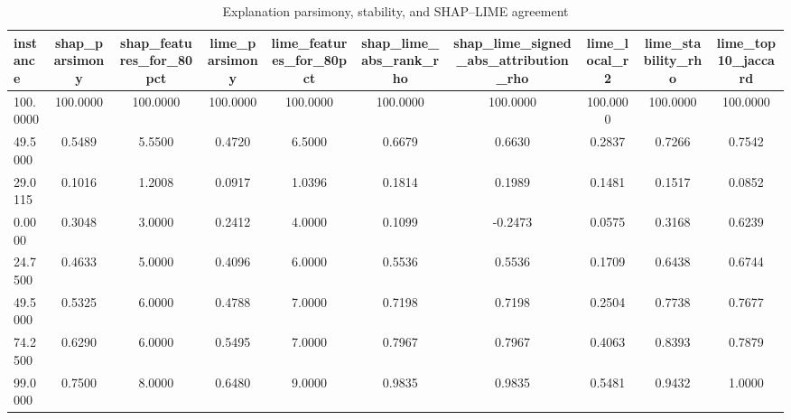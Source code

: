 \begin{table}
\centering
\caption{Explanation parsimony, stability, and SHAP--LIME agreement}
\label{tab:explanation_quality}
\begin{tabular}{lccccccccc}
\toprule
instance & shap_parsimony & shap_features_for_80pct & lime_parsimony & lime_features_for_80pct & shap_lime_abs_rank_rho & shap_lime_signed_abs_attribution_rho & lime_local_r2 & lime_stability_rho & lime_top10_jaccard \\
\midrule
100.0000 & 100.0000 & 100.0000 & 100.0000 & 100.0000 & 100.0000 & 100.0000 & 100.0000 & 100.0000 & 100.0000 \\
49.5000 & 0.5489 & 5.5500 & 0.4720 & 6.5000 & 0.6679 & 0.6630 & 0.2837 & 0.7266 & 0.7542 \\
29.0115 & 0.1016 & 1.2008 & 0.0917 & 1.0396 & 0.1814 & 0.1989 & 0.1481 & 0.1517 & 0.0852 \\
0.0000 & 0.3048 & 3.0000 & 0.2412 & 4.0000 & 0.1099 & -0.2473 & 0.0575 & 0.3168 & 0.6239 \\
24.7500 & 0.4633 & 5.0000 & 0.4096 & 6.0000 & 0.5536 & 0.5536 & 0.1709 & 0.6438 & 0.6744 \\
49.5000 & 0.5325 & 6.0000 & 0.4788 & 7.0000 & 0.7198 & 0.7198 & 0.2504 & 0.7738 & 0.7677 \\
74.2500 & 0.6290 & 6.0000 & 0.5495 & 7.0000 & 0.7967 & 0.7967 & 0.4063 & 0.8393 & 0.7879 \\
99.0000 & 0.7500 & 8.0000 & 0.6480 & 9.0000 & 0.9835 & 0.9835 & 0.5481 & 0.9432 & 1.0000 \\
\bottomrule
\end{tabular}
\end{table}
